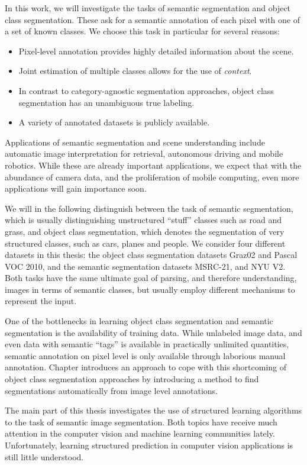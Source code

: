 In this work, we will investigate the tasks of semantic segmentation and object
class segmentation.  These ask for a semantic annotation of each pixel with one
of a set of known classes. We choose this task in particular for several reasons:
\begin{itemize}
    \item Pixel-level annotation provides highly detailed information about the scene.
    \item Joint estimation of multiple classes allows for the use of \emph{context}.
    \item In contrast to category-agnostic segmentation approaches, object class segmentation
        has an unambiguous true labeling.
    \item A variety of annotated datasets is publicly available.
\end{itemize}
%
Applications of semantic segmentation and scene understanding include automatic
image interpretation for retrieval, autonomous driving and mobile robotics.
While these are already important applications, we expect that with the
abundance of camera data, and the proliferation of mobile computing, even
more applications will gain importance soon.

We will in the following distinguish between the task of semantic segmentation,
which is usually distinguishing unstructured ``stuff'' classes such as road and
grass, and object class segmentation, which denotes the segmentation of very
structured classes, such as cars, planes and people.
We consider four different datasets in this thesis: the object class segmentation
datasets Graz02 and Pascal VOC 2010, and the semantic segmentation datasets MSRC-21,
and NYU V2.
%
Both tasks have the same ultimate goal of parsing, and therefore understanding, images
in terms of semantic classes, but usually employ  different mechanisms to represent the input.


One of the bottlenecks in learning object class segmentation and semantic
segmentation is the availability of training data.  While unlabeled image data,
and even data with semantic
``tags'' is available in practically unlimited quantities, semantic annotation
on pixel level is only available through laborious manual annotation. 
Chapter %
introduces an approach to cope with this shortcoming of object class segmentation approaches
by introducing a method to find segmentations automatically from image level annotations.

The main part of this thesis investigates the use of structured learning
algorithms to the task of semantic image segmentation. Both topics have receive
much attention in the computer vision and machine learning communities lately.
Unfortunately, learning structured prediction in computer vision applications
is still little understood.

